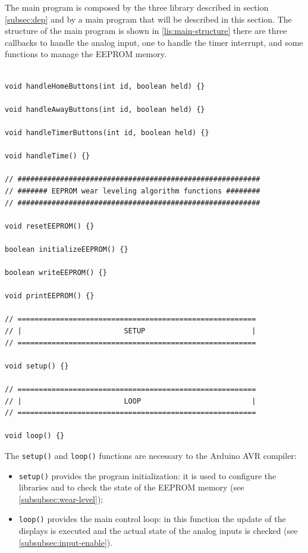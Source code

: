 \documentclass[11pt,english]{article}
\newcommand{\code}[1]{\texttt{#1}}
\begin{document}
The main program is composed by the three library described in section \ref{subsec:dep} and by a main 
program that will be described in this section. The structure of the main program is shown in \ref{lis:main-structure} 
there are three callbacks to handle the analog input, one to handle the timer interrupt, and some 
functions to manage the EEPROM memory.

%
\begin{lstlisting}[label=lis:main-structure,caption=Main program structure]

void handleHomeButtons(int id, boolean held) {}

void handleAwayButtons(int id, boolean held) {}

void handleTimerButtons(int id, boolean held) {}

void handleTime() {}

// #########################################################
// ####### EEPROM wear leveling algorithm functions ########
// #########################################################

void resetEEPROM() {}

boolean initializeEEPROM() {}

boolean writeEEPROM() {}

void printEEPROM() {}

// ========================================================
// |                        SETUP                         |
// ========================================================

void setup() {} 

// ========================================================
// |                        LOOP                          |
// ========================================================

void loop() {}
\end{lstlisting}

The \code{setup()} and \code{loop()} functions are necessary to the Arduino AVR compiler: 

\begin{itemize}
\item \code{setup()} provides the program initialization: it is used to configure the libraries
      and to check the state of the EEPROM memory (see \ref{subsubsec:wear-level});

\item \code{loop()} provides the main control loop: in this function the update of the displays is 
      executed and the actual state of the analog inputs is checked (see \ref{subsubsec:input-enable}).
\end{itemize}
\end{document}
